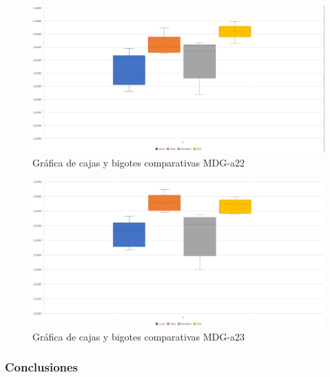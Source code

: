 	\begin{figure}[H]
		\centering
		\includegraphics[scale=0.3]{img/finalMDG2.png}
		\caption{Gráfica de cajas y bigotes comparativas MDG-a22}
		\label{MDG-a22_final}
	\end{figure}

	\begin{figure}[H]
		\centering
		\includegraphics[scale=0.3]{img/finalMDG3.png}
		\caption{Gráfica de cajas y bigotes comparativas MDG-a23}
		\label{MDG-a23_final}
	\end{figure}
	
	\subsubsection{Conclusiones}